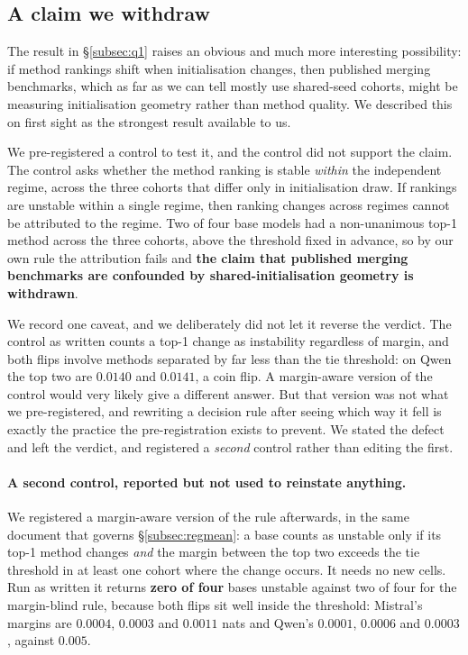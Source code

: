 \subsection{A claim we withdraw}
\label{subsec:withdrawn}

The result in \S\ref{subsec:q1} raises an obvious and much more
interesting possibility: if method rankings shift when initialisation
changes, then published merging benchmarks, which as far as we can tell
mostly use shared-seed cohorts, might be measuring initialisation
geometry rather than method quality. We described this on first sight as
the strongest result available to us.

We pre-registered a control to test it, and the control did not support
the claim. The control asks whether the method ranking is stable
\emph{within} the independent regime, across the three cohorts that
differ only in initialisation draw. If rankings are unstable within a
single regime, then ranking changes across regimes cannot be attributed
to the regime. Two of four base models had a non-unanimous top-1 method
across the three cohorts, above the threshold fixed in advance, so by our
own rule the attribution fails and \textbf{the claim that published
merging benchmarks are confounded by shared-initialisation geometry is
withdrawn}.

We record one caveat, and we deliberately did not let it reverse the
verdict. The control as written counts a top-1 change as instability
regardless of margin, and both flips involve methods separated by far less
than the tie threshold: on Qwen the top two are $0.0140$ and $0.0141$, a
coin flip. A margin-aware version of the control would very likely give a
different answer. But that version was not what we pre-registered, and
rewriting a decision rule after seeing which way it fell is exactly the
practice the pre-registration exists to prevent. We stated the defect and
left the verdict, and registered a \emph{second} control rather than
editing the first.

\paragraph{A second control, reported but not used to reinstate anything.}
We registered a margin-aware version of the rule afterwards, in the same
document that governs \S\ref{subsec:regmean}: a base counts as unstable
only if its top-1 method changes \emph{and} the margin between the top two
exceeds the tie threshold in at least one cohort where the change occurs.
It needs no new cells. Run as written it returns \textbf{zero of four}
bases unstable against two of four for the margin-blind rule, because both
flips sit well inside the threshold: Mistral's margins are $0.0004$,
$0.0003$ and $0.0011$ nats and Qwen's $0.0001$, $0.0006$ and $0.0003$,
against $0.005$.

